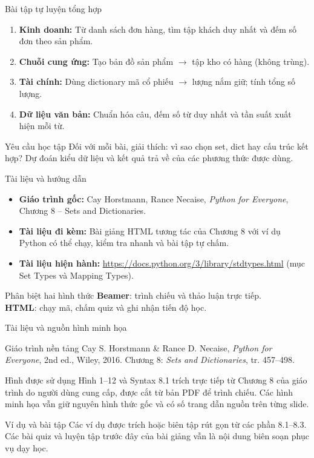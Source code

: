 \documentclass[aspectratio=169,10pt]{beamer}
\begin{document}
\begin{frame}[t]{Bài tập tự luyện tổng hợp}

\begin{enumerate}
\item \textbf{Kinh doanh:} Từ danh sách đơn hàng, tìm tập khách duy nhất và đếm số đơn theo sản phẩm.
\item \textbf{Chuỗi cung ứng:} Tạo bản đồ sản phẩm $\to$ tập kho có hàng (không trùng).
\item \textbf{Tài chính:} Dùng dictionary mã cổ phiếu $\to$ lượng nắm giữ; tính tổng số lượng.
\item \textbf{Dữ liệu văn bản:} Chuẩn hóa câu, đếm số từ duy nhất và tần suất xuất hiện mỗi từ.
\end{enumerate}
\begin{alertblock}{Yêu cầu học tập}
Đối với mỗi bài, giải thích: vì sao chọn set, dict hay cấu trúc kết hợp? Dự đoán kiểu dữ liệu và kết quả trả về của các phương thức được dùng.
\end{alertblock}

\end{frame}

\begin{frame}[t]{Tài liệu và hướng dẫn}

\begin{itemize}
\item \textbf{Giáo trình gốc:} Cay Horstmann, Rance Necaise, \emph{Python for Everyone}, Chương 8 -- Sets and Dictionaries.
\item \textbf{Tài liệu đi kèm:} Bài giảng HTML tương tác của Chương 8 với ví dụ Python có thể chạy, kiểm tra nhanh và bài tập tự chấm.
\item \textbf{Tài liệu hiện hành:} \url{https://docs.python.org/3/library/stdtypes.html} (mục Set Types và Mapping Types).
\end{itemize}
\medskip
\begin{block}{Phân biệt hai hình thức}
\textbf{Beamer}: trình chiếu và thảo luận trực tiếp.\\
\textbf{HTML}: chạy mã, chấm quiz và ghi nhận tiến độ học.
\end{block}

\end{frame}


\begin{frame}[t]{Tài liệu và nguồn hình minh họa}
\small
\begin{block}{Giáo trình nền tảng}
Cay S. Horstmann \& Rance D. Necaise, \textit{Python for Everyone}, 2nd ed., Wiley, 2016. Chương 8: \textit{Sets and Dictionaries}, tr. 457--498.
\end{block}
\begin{block}{Hình được sử dụng}
Hình 1--12 và Syntax 8.1 trích trực tiếp từ Chương 8 của giáo trình do người dùng cung cấp, được cắt từ bản PDF để trình chiếu. Các hình minh họa vẫn giữ nguyên hình thức gốc và có số trang dẫn nguồn trên từng slide.
\end{block}
\begin{block}{Ví dụ và bài tập}
Các ví dụ được trích hoặc biên tập rút gọn từ các phần 8.1--8.3. Các bài quiz và luyện tập trước đây của bài giảng vẫn là nội dung biên soạn phục vụ dạy học.
\end{block}
\end{frame}
\end{document}
